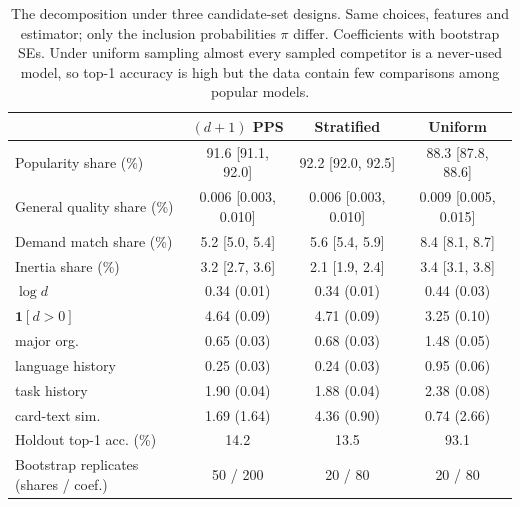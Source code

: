 \begin{table}[t]
\centering
\caption{The decomposition under three candidate-set designs. Same choices, features and estimator; only the inclusion probabilities $\pi$ differ. Coefficients with bootstrap SEs. Under uniform sampling almost every sampled competitor is a never-used model, so top-1 accuracy is high but the data contain few comparisons among popular models.}
\label{tab:q}
\footnotesize
\setlength{\tabcolsep}{4pt}
\begin{tabular}{lccc}
\toprule
 & $(d{+}1)$ PPS & Stratified & Uniform \\
\midrule
Popularity share (\%) & 91.6 [91.1, 92.0] & 92.2 [92.0, 92.5] & 88.3 [87.8, 88.6] \\
General quality share (\%) & 0.006 [0.003, 0.010] & 0.006 [0.003, 0.010] & 0.009 [0.005, 0.015] \\
Demand match share (\%) & 5.2 [5.0, 5.4] & 5.6 [5.4, 5.9] & 8.4 [8.1, 8.7] \\
Inertia share (\%) & 3.2 [2.7, 3.6] & 2.1 [1.9, 2.4] & 3.4 [3.1, 3.8] \\
\midrule
$\log d$ & 0.34 (0.01) & 0.34 (0.01) & 0.44 (0.03) \\
$\mathbf{1}[d>0]$ & 4.64 (0.09) & 4.71 (0.09) & 3.25 (0.10) \\
major org. & 0.65 (0.03) & 0.68 (0.03) & 1.48 (0.05) \\
language history & 0.25 (0.03) & 0.24 (0.03) & 0.95 (0.06) \\
task history & 1.90 (0.04) & 1.88 (0.04) & 2.38 (0.08) \\
card-text sim. & 1.69 (1.64) & 4.36 (0.90) & 0.74 (2.66) \\
\midrule
Holdout top-1 acc. (\%) & 14.2 & 13.5 & 93.1 \\
Bootstrap replicates (shares / coef.) & 50 / 200 & 20 / 80 & 20 / 80 \\
\bottomrule
\end{tabular}
\end{table}
